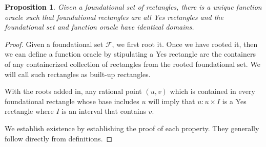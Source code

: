 \documentclass[12pt]{article}
\newtheorem{proposition}{Proposition}[subsection]
\begin{document}
\begin{proposition}\label{pr:foundation}
    Given a foundational set of rectangles, there is a unique function oracle such that foundational rectangles are all Yes rectangles and the foundational set and function oracle have identical domains. 
\end{proposition}



\begin{proof}
Given a foundational set $\mathcal{F}$, we first root it. Once we have rooted it, then we can define a function oracle by stipulating a Yes rectangle are the containers of any containerized collection of rectangles from the rooted foundational set. We will call such rectangles as built-up rectangles. 

With the roots added in, any rational point $(u,v)$ which is contained in every foundational rectangle whose base includes $u$ will imply that $u:u \times I$ is a Yes rectangle where $I$ is an interval that contains $v$. 
    
    We establish existence by establishing the proof of each property. They generally follow directly from definitions. 


\end{proof}
\end{document}
